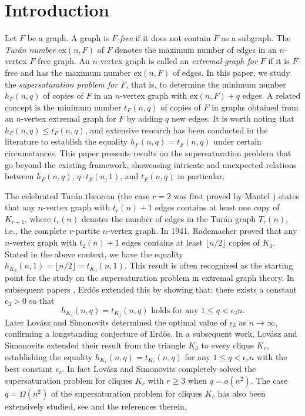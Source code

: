 \documentclass[10pt]{article}
\def\ex{\mathrm{ex}}
\begin{document}
\section{Introduction}
Let $F$ be a graph. A graph is {\it $F$-free} if it does not contain $F$ as a subgraph.
The {\it Tur\'{a}n number} $\ex(n,F)$ of $F$ denotes the maximum number of edges in an $n$-vertex $F$-free graph.
An $n$-vertex graph is called an {\it extremal graph for $F$} if it is $F$-free and has the maximum number $\ex(n,F)$ of edges.
In this paper, we study the {\it supersaturation problem for $F$}, that is, to determine the minimum number $h_F(n,q)$ of copies of $F$ in an $n$-vertex graph with $\ex(n,F)+q$ edges.
A related concept is the minimum number $t_F(n,q)$ of copies of $F$ in graphs obtained from an $n$-vertex extremal graph for $F$ by adding $q$ new edges.
It is worth noting that $h_F(n,q) \leq t_F(n,q)$, and extensive research has been conducted in the literature to establish the equality $h_F(n,q) = t_F(n,q)$ under certain circumstances.
This paper presents results on the supersaturation problem that go beyond the existing framework,
showcasing intricate and unexpected relations between $h_F(n,q)$, $q\cdot t_F(n,1)$, and $t_F(n,q)$ in particular.


The celebrated Tur\'{a}n theorem \cite{turan1941} (the case $r=2$ was first proved by Mantel \cite{Man07}) states that any $n$-vertex graph with $t_r(n)+1$ edges contains at least one copy of $K_{r+1}$, where $t_r(n)$ denotes the number of edges in the Tur\'an graph $T_r(n)$, i.e., the complete $r$-partite $n$-vertex graph.
In 1941, Rademacher proved that any $n$-vertex graph with $t_2(n)+1$ edges contains at least $\lfloor n/2\rfloor$ copies of $K_3$.
Stated in the above context, we have the equality $h_{K_3}(n,1)=\lfloor n/2\rfloor= t_{K_3}(n,1)$.
This result is often recognized as the starting point for the study on the supersaturation problem in extremal graph theory.
In subsequent papers \cite{erd55,erd62-1}, Erd\H{o}s extended this by showing that: there exists a constant $\epsilon_3>0$ so that
$$\mbox{$h_{K_3}(n,q)=t_{K_3}(n,q)$ holds for any $1\leq q<\epsilon_{3}n$.}$$
Later Lov\'{a}sz and Simonovits \cite{Lovasz1976} determined the optimal value of $\epsilon_{3}$ as $n\to \infty$, confirming a longstanding conjecture of Erd\H{o}s.
In a subsequent work, Lov\'{a}sz and Simonovits \cite{Lovasz1983} extended their result from the triangle $K_3$ to every clique $K_r$,
establishing the equality $h_{K_r}(n,q)=t_{K_r}(n,q)$ for any $1\leq q<\epsilon_{r}n$ with the best constant $\epsilon_r$.
In fact Lov\'{a}sz and Simonovits \cite{Lovasz1983} completely solved the supersaturation problem for cliques $K_r$ with $r\geq 3$ when $q=o(n^2)$.
The case $q=\Omega(n^2)$ of the supersaturation problem for cliques $K_r$ has also been extensively studied, see \cite{Fisher1989,Fisher1992,razborov2008,nikiforov2011,Reiher2016,LPS2020} and the references therein.
\end{document}
